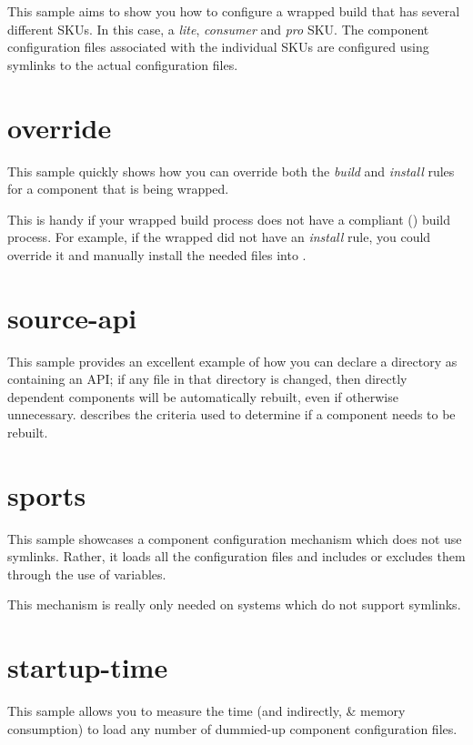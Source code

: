 This sample aims to show you how to configure a wrapped build that has
several different SKUs.  In this case, a \emph{lite}, \emph{consumer}
and \emph{pro} SKU.  The component configuration files associated with
the individual SKUs are configured using symlinks to the actual
configuration files.

\section{override}

This sample quickly shows how you can override both the \emph{build}
and \emph{install} rules for a component that is being wrapped.

This is handy if your wrapped build process does not have a compliant
() build process.  For example, if the
wrapped \makefile did not have an \emph{install} rule, you could
override it and manually install the needed files into \destdir.

\section{source-api}

This sample provides an excellent example of how you can declare a
directory as containing an API; if any file in that directory is
changed, then directly dependent components will be automatically
rebuilt, even if otherwise unnecessary.
 describes the criteria used to
determine if a component needs to be rebuilt.

\section{sports}\label{samples:sports}

This sample showcases a component configuration mechanism which does
not use symlinks.  Rather, it loads all the configuration files and
includes or excludes them through the use of \make variables.

This mechanism is really only needed on systems which do not support
symlinks.

\section{startup-time}\label{samples:startup-time}

This sample allows you to measure the time (and indirectly, \lmsbw \&
\make memory consumption) to load any number of dummied-up component
configuration files.

